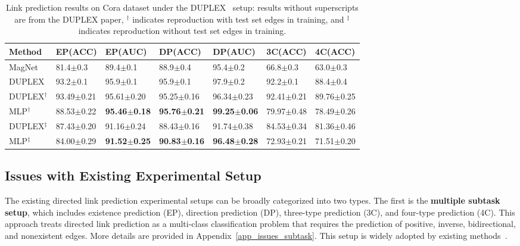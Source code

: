 \begin{table*}[th]
\centering
\caption{Link prediction results on Cora dataset under the DUPLEX~\cite{duplex} setup: results without superscripts are from the DUPLEX paper, $^\dagger$ indicates reproduction with test set edges in training, and $^\ddagger$ indicates reproduction without test set edges in training.}
\begin{tabular}{@{}lllllll@{}}
\toprule

Method &EP(ACC) &EP(AUC) &DP(ACC) &DP(AUC) &3C(ACC) &4C(ACC) \\ \midrule
 MagNet &81.4$\pm$0.3 &89.4$\pm$0.1 &88.9$\pm$0.4 &95.4$\pm$0.2 &66.8$\pm$0.3 &63.0$\pm$0.3 \\
 DUPLEX &93.2$\pm$0.1 &95.9$\pm$0.1 &95.9$\pm$0.1 &97.9$\pm$0.2 &92.2$\pm$0.1 &88.4$\pm$0.4  \\ \midrule

 DUPLEX$^\dagger$ &93.49$\pm$0.21 &95.61$\pm$0.20 &95.25$\pm$0.16 &96.34$\pm$0.23  &92.41$\pm$0.21 &89.76$\pm$0.25 \\

 MLP$^\dagger$ &88.53$\pm$0.22	&\textbf{95.46$\pm$0.18}	&\textbf{95.76$\pm$0.21}	&\textbf{99.25$\pm$0.06}	&79.97$\pm$0.48	&78.49$\pm$0.26  \\ \midrule

 DUPLEX$^\ddagger$ &87.43$\pm$0.20 &91.16$\pm$0.24 &88.43$\pm$0.16 &91.74$\pm$0.38 &84.53$\pm$0.34 &81.36$\pm$0.46 \\
 MLP$^\ddagger$ &84.00$\pm$0.29	&\textbf{91.52$\pm$0.25}	&\textbf{90.83$\pm$0.16}	&\textbf{96.48$\pm$0.28}	&72.93$\pm$0.21	&71.51$\pm$0.20  \\
  \bottomrule

\end{tabular}
\label{tb:duplex}
\end{table*}




\subsection{Issues with Existing Experimental Setup}\label{issues}
The existing directed link prediction experimental setups can be broadly categorized into two types. The first is the \textbf{multiple subtask setup}, which includes existence prediction (EP), direction prediction (DP), three-type prediction (3C), and four-type prediction (4C). This approach treats directed link prediction as a multi-class classification problem that requires the prediction of positive, inverse, bidirectional, and nonexistent edges. More details are provided in Appendix~\ref{app_issues_subtask}. This setup is widely adopted by existing methods~\cite{magnet,dpyg,fiorini2023sigmanet,lin2023magnetic,duplex,lightdic}.


